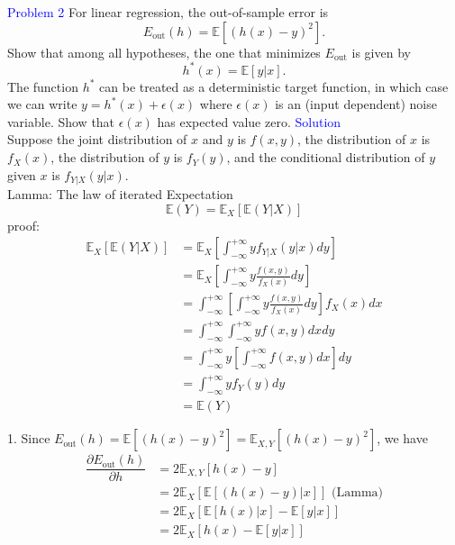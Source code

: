 \textcolor{blue}{Problem 2}
For linear regression, the out-of-sample error is 
\begin{equation}
    E_{\text{out}}(h)=\mathbb{E}[{(h(x)-y)}^2].
\end{equation}
Show that among all hypotheses, the one that minimizes $E_{\text{out}}$ is given by
\begin{equation}
    h^*(x)=\mathbb{E}[y|x].
\end{equation}
The function $h^*$ can be treated as a deterministic target function, in which case we can write $y=h^*(x)+\epsilon(x)$ where $\epsilon(x)$ is an (input dependent) noise variable. Show that $\epsilon(x)$ has expected value zero.
\newline
\textcolor{blue}{Solution}\\
Suppose the joint distribution of $x$ and $y$ is $f(x, y)$, the distribution of $x$ is $f_X(x)$, the distribution of $y$ is $f_Y(y)$, and the conditional distribution of $y$ given $x$ is $f_{Y|X}(y|x)$.\\

Lamma: The law of iterated Expectation
$$\mathbb{E}(Y)=\mathbb{E}_X[\mathbb{E}(Y|X)]$$
proof:
\begin{align*}
\mathbb{E}_X[\mathbb{E}(Y|X)] &= \mathbb{E}_X\left[\int_{-\infty}^{+\infty} y f_{Y|X}(y|x) d y\right] \\
&= \mathbb{E}_X\left[\int_{-\infty}^{+\infty} y \frac{f(x, y)}{f_X(x)} d y\right] \\
&=\int_{-\infty}^{+\infty}\left[\int_{-\infty}^{+\infty} y \frac{f(x, y)}{f_X(x)} d y\right] f_X(x) d x \\
&=\int_{-\infty}^{+\infty} \int_{-\infty}^{+\infty} y f(x, y) d x d y \\
&=\int_{-\infty}^{+\infty} y\left[\int_{-\infty}^{+\infty} f(x, y) d x\right] d y \\
&=\int_{-\infty}^{+\infty} y f_Y(y) d y \\
&=\mathbb{E}(Y)
\end{align*}

1. Since $E_{\text{out}}(h)=\mathbb{E}[{(h(x)-y)}^2]=\mathbb{E}_{X,Y}[{(h(x)-y)}^2]$, we have
\begin{align*}
    \dfrac{\partial E_{\text{out}}(h)}{\partial h} &= 2 \mathbb{E}_{X,Y}[h(x)-y] \\
    &= 2 \mathbb{E}_X\left[\mathbb{E}\left[(h(x)-y)|x\right]\right] \text{\ \ \ \ \ \ \ (Lamma)} \\
    &= 2 \mathbb{E}_X\left[\mathbb{E}\left[h(x)|x\right]-\mathbb{E}\left[y|x\right]\right] \\
    &= 2 \mathbb{E}_X\left[h(x)-\mathbb{E}\left[y|x\right]\right]
\end{align*}


